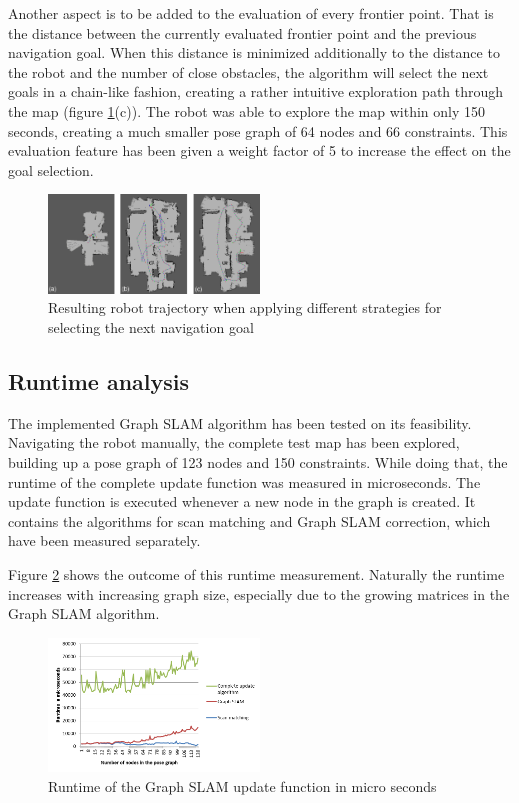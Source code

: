 \documentclass{ba-kecs}
\begin{document}
Another aspect is to be added to the evaluation of every frontier point. That is the distance between the currently evaluated frontier point and the previous navigation goal. When this distance is minimized additionally to the distance to the robot and the number of close obstacles, the algorithm will select the next goals in a chain-like fashion, creating a rather intuitive exploration path through the map (figure \ref{fig:navigation_comparison}(c)). The robot was able to explore the map within only 150 seconds, creating a much smaller pose graph of 64 nodes and 66 constraints. This evaluation feature has been given a weight factor of 5 to increase the effect on the goal selection.

\begin{figure}[htbp]
	\centering
		\includegraphics[width=0.50\textwidth]{figures/Navigation_comparison.jpg}
	\caption{Resulting robot trajectory when applying different strategies for selecting the next navigation goal}
	\label{fig:navigation_comparison}
\end{figure}

\subsection{Runtime analysis}
The implemented Graph SLAM algorithm has been tested on its feasibility. Navigating the robot manually, the complete test map has been explored, building up a pose graph of 123 nodes and 150 constraints. While doing that, the runtime of the complete update function was measured in microseconds. The update function is executed whenever a new node in the graph is created. It contains the algorithms for scan matching and Graph SLAM correction, which have been measured separately.

Figure \ref{fig:runtime} shows the outcome of this runtime measurement. Naturally the runtime increases with increasing graph size, especially due to the growing matrices in the Graph SLAM algorithm.

\begin{figure}[htbp]
	\centering
		\includegraphics[width=0.50\textwidth]{figures/Runtime.png}
	\caption{Runtime of the Graph SLAM update function in micro seconds}
	\label{fig:runtime}
\end{figure}
\end{document}

